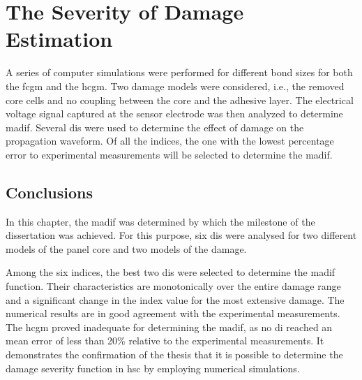 \chapter[The Severity of Damage Estimation]{The Severity of Damage Estimation}
\label{ch:severity}

A series of computer simulations were performed for different bond sizes for both the \ac{fcgm} and the \ac{hcgm}.
Two damage models were considered, i.e., the removed core cells  and no coupling between the core and the adhesive layer.
The electrical voltage signal captured at the sensor electrode was then analyzed to determine \ac{madif}.
Several \acfp{di} were used to determine the effect of damage on the propagation waveform.
Of all the indices, the one with the lowest percentage error to experimental measurements will be selected to determine the \ac{madif}.




\section{Conclusions}
\label{sec:conclusionsSever}
In this chapter, the \ac{madif} was determined by which the milestone of the dissertation was achieved.
For this purpose, six \acp{di} were analysed for two different models of the panel core and two models of the damage.

Among the six indices, the best two \acp{di} were selected to determine the \ac{madif} function.
Their characteristics are monotonically over the entire damage range and a significant change in the index value for the most extensive damage.
The numerical results are in good agreement with the experimental measurements.
The \ac{hcgm} proved inadequate for determining the \ac{madif}, as no \ac{di} reached an mean error of less than 20\% relative to the experimental measurements.
It demonstrates the confirmation of the thesis that it is possible to determine the damage severity function in \ac{hsc} by employing numerical simulations.